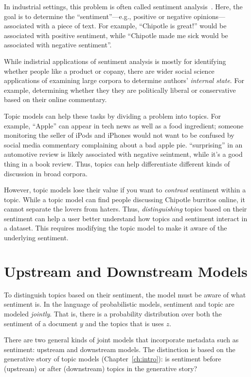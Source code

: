 In industrial settings, this problem is often called sentiment
analysis~\citep{pang-08}.  Here, the goal is to determine the
``sentiment''---e.g., positive or negative opinions---associated with
a piece of text.  For example, ``Chipotle is great!'' would be
associated with positive sentiment, while ``Chipotle made me sick
would be associated with negative sentiment''.

While indistrial applications of sentiment analysis is mostly for
identifying whether people like a product or copany, there are wider
social science applications of examining large corpora to determine
authors' \emph{internal state}.  For example, determining whether they
they are politically liberal or conservative based on their online
commentary.

Topic models can help these tasks by dividing a problem into topics.
For example, ``Apple'' can appear in tech news as well as a food
ingredient; someone monitoring the seller of iPods and iPhones would
not want to be confused by social media commentary complaining about a
bad apple pie.  ``surprising'' in an automotive review is likely
associated with negative seintment, while it's a good thing in a book
review.  Thus, topics can help differentiate different kinds of
discussion in broad corpora.

However, topic models lose their value if you want to \emph{contrast}
sentiment within a topic.  While a topic model can find people
discussing Chipotle burritos online, it cannot separate the lovers from
haters.  Thus, \emph{distinguishing} topics based on their sentiment
can help a user better understand how topics and sentiment interact in
a dataset.  This requires modifying the topic model to make it aware
of the underlying sentiment.


\section{Upstream and Downstream Models}

To distinguish topics based on their sentiment, the model must be
aware of what sentiment is.  In the language of probabilistic models,
sentiment and topic are modeled \emph{jointly}.  That is, there is a
probability distribution over both the sentiment of a document $y$ and
the topics that is uses $z$.

There are two general kinds of joint models that incorporate metadata
such as sentiment: upstream and downstream models.  The distinction is
based on the generative story of topic models (Chapter~\ref{ch:intro}): is
sentiment before (upstream) or after (downstream) topics in the
generative story?

